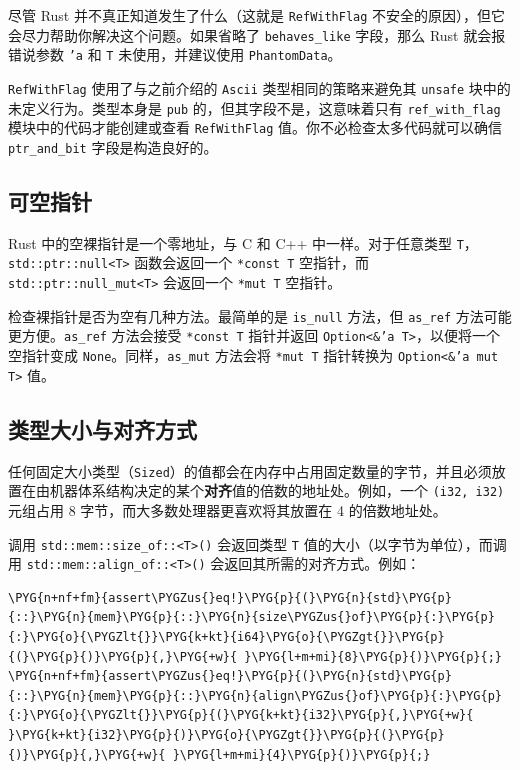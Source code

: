 尽管 Rust 并不真正知道发生了什么（这就是 \texttt{RefWithFlag} 不安全的原因），但它会尽力帮助你解决这个问题。如果省略了 \texttt{behaves\_like} 字段，那么 Rust 就会报错说参数 \texttt{'a} 和 \texttt{T} 未使用，并建议使用 \texttt{PhantomData}。

\texttt{RefWithFlag} 使用了与之前介绍的 \texttt{Ascii} 类型相同的策略来避免其 \texttt{unsafe} 块中的未定义行为。类型本身是 \texttt{pub} 的，但其字段不是，这意味着只有 \texttt{ref\_with\_flag} 模块中的代码才能创建或查看 \texttt{RefWithFlag} 值。你不必检查太多代码就可以确信 \texttt{ptr\_and\_bit} 字段是构造良好的。

\subsection{可空指针}

Rust 中的空裸指针是一个零地址，与 C 和 C++ 中一样。对于任意类型 \texttt{T}，\texttt{std::ptr::null<T>} 函数会返回一个 \texttt{*const T} 空指针，而 \texttt{std::ptr::null\_mut<T>} 会返回一个 \texttt{*mut T} 空指针。

检查裸指针是否为空有几种方法。最简单的是 \texttt{is\_null} 方法，但 \texttt{as\_ref} 方法可能更方便。\texttt{as\_ref} 方法会接受 \texttt{*const T} 指针并返回 \texttt{Option<\&'a T>}，以便将一个空指针变成 \texttt{None}。同样，\texttt{as\_mut} 方法会将 \texttt{*mut T} 指针转换为 \texttt{Option<\&'a mut T>} 值。

\subsection{类型大小与对齐方式}

任何固定大小类型（\texttt{Sized}）的值都会在内存中占用固定数量的字节，并且必须放置在由机器体系结构决定的某个\textbf{对齐}值的倍数的地址处。例如，一个 \texttt{(i32, i32)} 元组占用 8 字节，而大多数处理器更喜欢将其放置在 4 的倍数地址处。

调用 \texttt{std::mem::size\_of::<T>()} 会返回类型 \texttt{T} 值的大小（以字节为单位），而调用 \texttt{std::mem::align\_of::<T>()} 会返回其所需的对齐方式。例如：

\begin{Verbatim}[commandchars=\\\{\},breaklines=true,breakanywhere=true,fontsize=\codefont,xleftmargin=17bp]
\PYG{n+nf+fm}{assert\PYGZus{}eq!}\PYG{p}{(}\PYG{n}{std}\PYG{p}{::}\PYG{n}{mem}\PYG{p}{::}\PYG{n}{size\PYGZus{}of}\PYG{p}{:}\PYG{p}{:}\PYG{o}{\PYGZlt{}}\PYG{k+kt}{i64}\PYG{o}{\PYGZgt{}}\PYG{p}{(}\PYG{p}{)}\PYG{p}{,}\PYG{+w}{ }\PYG{l+m+mi}{8}\PYG{p}{)}\PYG{p}{;}
\PYG{n+nf+fm}{assert\PYGZus{}eq!}\PYG{p}{(}\PYG{n}{std}\PYG{p}{::}\PYG{n}{mem}\PYG{p}{::}\PYG{n}{align\PYGZus{}of}\PYG{p}{:}\PYG{p}{:}\PYG{o}{\PYGZlt{}}\PYG{p}{(}\PYG{k+kt}{i32}\PYG{p}{,}\PYG{+w}{ }\PYG{k+kt}{i32}\PYG{p}{)}\PYG{o}{\PYGZgt{}}\PYG{p}{(}\PYG{p}{)}\PYG{p}{,}\PYG{+w}{ }\PYG{l+m+mi}{4}\PYG{p}{)}\PYG{p}{;}
\end{Verbatim}

